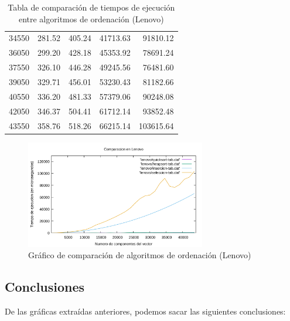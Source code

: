 \documentclass{homework}
\begin{document}
\begin{table}[H]
\begin{tabular}{|r|r|r|r|r|}
            34550 & 281.52 & 405.24 & 41713.63 & 91810.12 \\ 
            36050 & 299.20 & 428.18 & 45353.92 & 78691.24 \\ 
            37550 & 326.10 & 446.28 & 49245.56 & 76481.60 \\ 
            39050 & 329.71 & 456.01 & 53230.43 & 81182.66 \\ 
            40550 & 336.20 & 481.33 & 57379.06 & 90248.08 \\ 
            42050 & 346.37 & 504.41 & 61712.14 & 93852.48 \\ 
            43550 & 358.76 & 518.26 & 66215.14 & 103615.64 \\ 
            \hline
        \end{tabular}
        \caption{Tabla de comparación de tiempos de ejecución entre algoritmos de ordenación (Lenovo)}

    \end{table}

    \begin{figure}[H]
        \centering
        \label{lenovo:orden}
           \includegraphics[width=0.7\textwidth]{../data/lenovo-orden-todos.pdf}
        \caption{Gráfico de comparación de algoritmos de ordenación (Lenovo)}
    \end{figure}

    \vspace{2cm}

    \subsection{Conclusiones}
    
    De las gráficas extraídas anteriores, podemos sacar las siguientes conclusiones:
    
\end{document}
